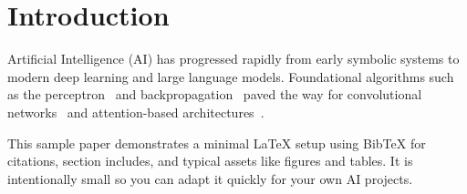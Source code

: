 \section{Introduction}
Artificial Intelligence (AI) has progressed rapidly from early symbolic systems to modern deep learning and large language models. Foundational algorithms such as the perceptron~\citep{rosenblatt1958perceptron} and backpropagation~\citep{rumelhart1986learning} paved the way for convolutional networks~\citep{lecun1998gradient,krizhevsky2012imagenet} and attention-based architectures~\citep{vaswani2017attention,devlin2018bert,brown2020language}.

This sample paper demonstrates a minimal LaTeX setup using Bib\TeX{} for citations, section includes, and typical assets like figures and tables. It is intentionally small so you can adapt it quickly for your own AI projects.

